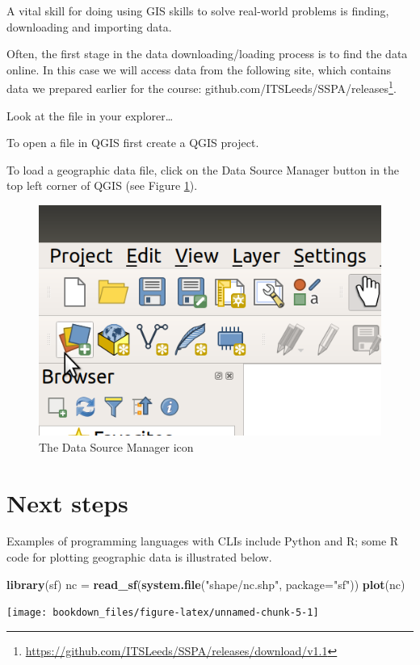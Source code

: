 \documentclass[10pt,a5paper,]{book}
\makeatletter
\newenvironment{Shaded}{\begin{snugshade}}{\end{snugshade}}
\newcommand{\DataTypeTok}[1]{\textcolor[rgb]{0.27,0.27,0.27}{#1}}
\newcommand{\KeywordTok}[1]{\textcolor[rgb]{0.27,0.27,0.27}{\textbf{#1}}}
\newcommand{\NormalTok}[1]{#1}
\newcommand{\StringTok}[1]{\textcolor[rgb]{0.5,0.5,0.5}{#1}}
\renewcommand{\href}[2]{#2\footnote{\url{#1}}}
\newenvironment{kframe}{%
\medskip{}
\setlength{\fboxsep}{.8em}
 \def\at@end@of@kframe{}%
 \ifinner\ifhmode%
  \def\at@end@of@kframe{\end{minipage}}%
  \begin{minipage}{\columnwidth}%
 \fi\fi%
 \def\FrameCommand##1{\hskip\@totalleftmargin \hskip-\fboxsep
 \colorbox{shadecolor}{##1}\hskip-\fboxsep
     \hskip-\linewidth \hskip-\@totalleftmargin \hskip\columnwidth}%
 \MakeFramed {\advance\hsize-\width
   \@totalleftmargin\z@ \linewidth\hsize
   \@setminipage}}%
 {\par\unskip\endMakeFramed%
 \at@end@of@kframe}
\renewenvironment{Shaded}{\begin{kframe}}{\end{kframe}}
\makeatother
\begin{document}
A vital skill for doing using GIS skills to solve real-world problems is finding, downloading and importing data.

Often, the first stage in the data downloading/loading process is to find the data online.
In this case we will access data from the following site, which contains data we prepared earlier for the course: \href{https://github.com/ITSLeeds/SSPA/releases/download/v1.1}{github.com/ITSLeeds/SSPA/releases}.

Look at the file in your explorer\ldots{}

To open a file in QGIS first create a QGIS project.

To load a geographic data file, click on the Data Source Manager button in the top left corner of QGIS (see Figure \ref{fig:data-source-manager}).

\begin{figure}
\includegraphics[width=0.5\linewidth]{figures/open-data-source-manager} \caption{The Data Source Manager icon}\label{fig:data-source-manager}
\end{figure}

\hypertarget{next-steps}{%
\chapter{Next steps}\label{next-steps}}

Examples of programming languages with CLIs include Python and R; some R
code for plotting geographic data is illustrated below.

\begin{Shaded}
\begin{Highlighting}[]
\KeywordTok{library}\NormalTok{(sf)}
\NormalTok{nc =}\StringTok{ }\KeywordTok{read_sf}\NormalTok{(}\KeywordTok{system.file}\NormalTok{(}\StringTok{"shape/nc.shp"}\NormalTok{, }\DataTypeTok{package=}\StringTok{"sf"}\NormalTok{))}
\KeywordTok{plot}\NormalTok{(nc)}
\end{Highlighting}
\end{Shaded}

\texttt{[image: bookdown\_files/figure-latex/unnamed-chunk-5-1]}
\end{document}
